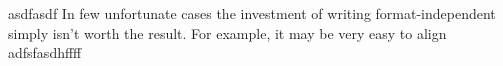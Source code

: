 asdfasdf
In few unfortunate cases the investment of writing format-independent \latex simply isn't worth the result. For example, it may be very easy to align adfsfasdhffff